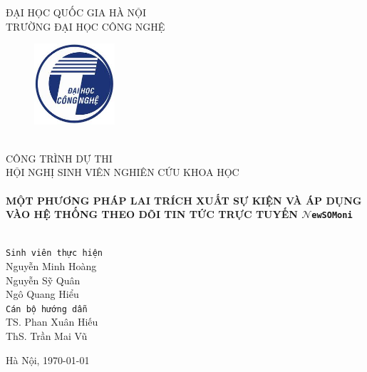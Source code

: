 \begin{titlepage}
\begin{center}
\textsc{\Large ĐẠI HỌC QUỐC GIA HÀ NỘI \\ TRƯỜNG ĐẠI HỌC CÔNG NGHỆ}
\\[0.3cm]
\begin{figure}[ht]
\centering
\includegraphics[height=3cm,width=3cm]{./resources/img/coltech.jpg}
\end{figure}


\large{\textsc{$\;$\\CÔNG TRÌNH DỰ THI \\HỘI NGHỊ SINH VIÊN NGHIÊN CỨU KHOA HỌC}} \\[0.3cm]

\HRule \\[0.4cm]
  {\Large \bfseries MỘT PHƯƠNG PHÁP LAI TRÍCH XUẤT SỰ KIỆN VÀ ÁP DỤNG VÀO HỆ THỐNG THEO DÕI TIN TỨC TRỰC TUYẾN $\mathcal{N}$\texttt{ewSOMoni}} \\[0.1cm]
\HRule \\[1cm]
\begin{Large}
\begin{flushright}
\texttt{Sinh viên thực hiện}\\
\indent Nguyễn Minh Hoàng\\
\indent Nguyễn Sỹ Quân \\
\indent Ngô Quang Hiểu	\\[0.3cm]
\texttt{Cán bộ hướng dẫn}\\
\indent TS. Phan Xuân Hiếu\\
\indent ThS. Trần Mai Vũ\\[1cm]

\end{flushright}
\end{Large}

\vfill

{\large Hà Nội, \today}
\end{center}

\end{titlepage}
